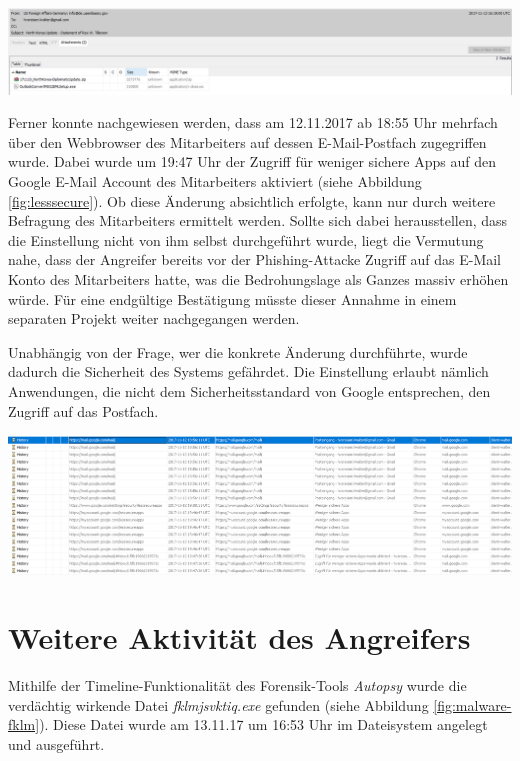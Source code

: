 \begin{center}
	\includegraphics[width=15.8cm]{figures/email2.png}
	\label{fig:email2}
\end{center}

Ferner konnte nachgewiesen werden, dass am 12.11.2017 ab 18:55 Uhr mehrfach über den Webbrowser des Mitarbeiters auf dessen E-Mail-Postfach  zugegriffen wurde.
Dabei wurde um 19:47 Uhr der Zugriff für weniger sichere Apps auf den Google E-Mail Account des Mitarbeiters aktiviert (siehe Abbildung \ref{fig:lesssecure}).
Ob diese Änderung absichtlich erfolgte, kann nur durch weitere Befragung des Mitarbeiters ermittelt werden.
Sollte sich dabei herausstellen, dass die Einstellung nicht von ihm selbst durchgeführt wurde, liegt die Vermutung nahe, dass der Angreifer bereits vor der Phishing-Attacke Zugriff auf das E-Mail Konto des Mitarbeiters hatte, was die Bedrohungslage als Ganzes massiv erhöhen würde.
Für eine endgültige Bestätigung müsste dieser Annahme in einem separaten Projekt weiter nachgegangen werden.

Unabhängig von der Frage, wer die konkrete Änderung durchführte, wurde dadurch die Sicherheit des Systems gefährdet. Die Einstellung erlaubt nämlich Anwendungen, die nicht dem Sicherheitsstandard von Google entsprechen, den Zugriff auf das Postfach.

\begin{center}
	\includegraphics[width=15.8cm]{figures/lesssecure.png}
	\label{fig:lesssecure}
\end{center}

\chapter{Weitere Aktivität des Angreifers}
Mithilfe der Timeline-Funktionalität des Forensik-Tools \textit{Autopsy} wurde die verdächtig wirkende Datei \textit{fklmjsvktiq.exe} gefunden (siehe Abbildung \ref{fig:malware-fklm}).
Diese Datei wurde am 13.11.17 um 16:53 Uhr im Dateisystem angelegt und ausgeführt.

